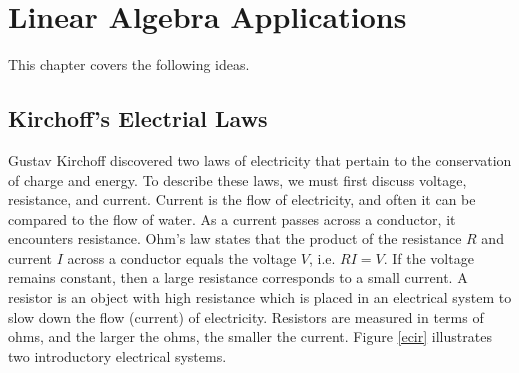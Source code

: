 
\chapter{Linear Algebra Applications}

This chapter covers the following ideas.  



\section{Kirchoff's Electrial Laws}
Gustav Kirchoff discovered two laws of electricity that pertain to the conservation of charge and energy.  To describe these laws, we must first discuss voltage, resistance, and current.  Current is the flow of electricity, and often it can be compared to the flow of water.  As a current passes across a conductor, it encounters resistance. Ohm's law states that the product of the resistance $R$ and current $I$ across a conductor equals the voltage $V$, i.e. $RI=V$. If the voltage remains constant, then a large resistance corresponds to a small current. A resistor is an object with high resistance which is placed in an electrical system to slow down the flow (current) of electricity.  Resistors are measured in terms of ohms, and the larger the ohms, the smaller the current.  Figure \ref{ecir} illustrates two introductory electrical systems. 



